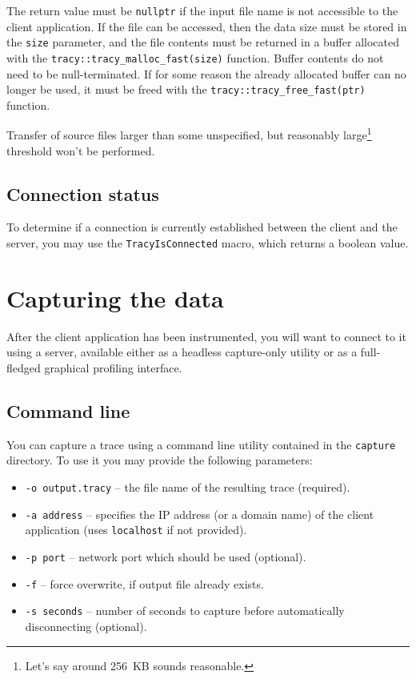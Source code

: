 \documentclass[hidelinks,titlepage,a4paper]{article}
\begin{document}
The return value must be \texttt{nullptr} if the input file name is not accessible to the client application. If the file can be accessed, then the data size must be stored in the \texttt{size} parameter, and the file contents must be returned in a buffer allocated with the \texttt{tracy::tracy\_malloc\_fast(size)} function. Buffer contents do not need to be null-terminated. If for some reason the already allocated buffer can no longer be used, it must be freed with the \texttt{tracy::tracy\_free\_fast(ptr)} function.

Transfer of source files larger than some unspecified, but reasonably large\footnote{Let's say around 256~KB sounds reasonable.} threshold won't be performed.

\subsection{Connection status}
\label{connectionstatus}

To determine if a connection is currently established between the client and the server, you may use the \texttt{TracyIsConnected} macro, which returns a boolean value.

\section{Capturing the data}
\label{capturing}

After the client application has been instrumented, you will want to connect to it using a server, available either as a headless capture-only utility or as a full-fledged graphical profiling interface.

\subsection{Command line}

You can capture a trace using a command line utility contained in the \texttt{capture} directory. To use it you may provide the following parameters:

\begin{itemize}
\item \texttt{-o output.tracy} -- the file name of the resulting trace (required).
\item \texttt{-a address} -- specifies the IP address (or a domain name) of the client application (uses \texttt{localhost} if not provided).
\item \texttt{-p port} -- network port which should be used (optional).
\item \texttt{-f} -- force overwrite, if output file already exists.
\item \texttt{-s seconds} -- number of seconds to capture before automatically disconnecting (optional).
\end{itemize}
\end{document}
